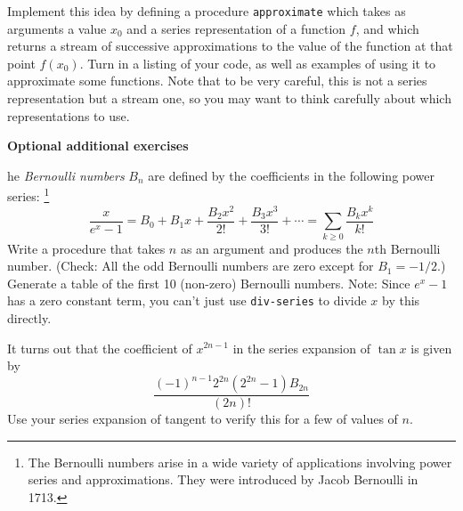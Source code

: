 Implement this idea by defining a procedure {\tt approximate} which
takes as arguments a value $x_0$ and a series representation of a
function $f$, and which returns a stream of successive approximations
to the value of the function at that point $f(x_0)$.  Turn in a
listing
of your code, as well as examples of using it to approximate some
functions.
Note that to be very careful, this is not a series representation but
a stream one, so you may want to think carefully about which
representations to use.

{\bf Optional additional exercises}

he {\em Bernoulli numbers} $B_n$ are
defined by the coefficients in the following power series:%
%
\footnote{The Bernoulli numbers arise in a wide variety of
applications involving power series and approximations.  They were
introduced by Jacob Bernoulli in 1713.}%
%
\[
\frac{x}{e^x-1} = B_0 + B_1 x + \frac{B_2 x^2}{2!} + \frac{B_3
x^3}{3!} + \cdots = \sum_{k \geq 0} \frac{B_k x^k}{k!}
\]
Write a procedure that takes $n$ as an argument and produces the $n$th
Bernoulli number.  (Check: All the odd Bernoulli numbers are zero
except for $B_1=-1/2$.)  Generate a table of the first 10 (non-zero)
Bernoulli numbers.  Note: Since $e^x-1$ has a zero constant term, you
can't just use {\tt div-series} to divide $x$ by this directly.

It turns out that the coefficient of
$x^{2n-1}$ in the series expansion of $\tan x$ is given by
\[
\frac{(-1)^{n-1} 2^{2n} (2^{2n} - 1) B_{2n}}{(2n)!}
\]
Use your series expansion of tangent to verify this for a few of
values of $n$.



